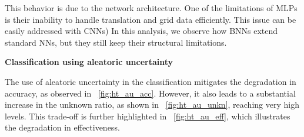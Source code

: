 This behavior is due to the network architecture. One of the limitations of MLPs is their inability to handle translation and grid data efficiently. This issue can be easily addressed with CNNs) In this analysis, we observe how BNNs extend standard NNs, but they still keep their structural limitations.

\vspace{0.3cm}
\textbf{Classification using aleatoric uncertainty}
\vspace{0.1cm}

The use of aleatoric uncertainty in the classification mitigates the degradation in accuracy, as observed in \Fig~\ref{fig:ht_au_acc}. However, it also leads to a substantial increase in the unknown ratio, as shown in \Fig~\ref{fig:ht_au_unkn}, reaching very high levels. This trade-off is further highlighted in \Fig~\ref{fig:ht_au_eff}, which illustrates the degradation in effectiveness.

